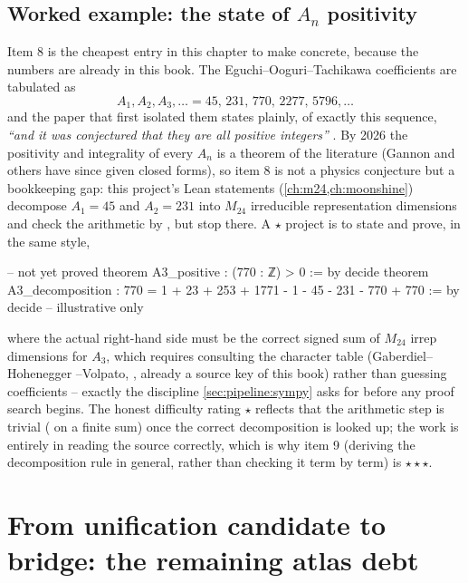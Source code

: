 \subsection{Worked example: the state of $A_n$ positivity}\label{sec:open:moonshine-worked}

Item 8 is the cheapest entry in this chapter to make concrete, because the numbers are
already in this book. The Eguchi--Ooguri--Tachikawa coefficients are tabulated as
\begin{equation}\label{eq:open:antable}
  A_1,A_2,A_3,\dots=45,\,231,\,770,\,2277,\,5796,\dots
\end{equation}
and the paper that first isolated them states plainly, of exactly this sequence,
\emph{``and it was conjectured that they are all positive integers''} . By 2026 the positivity and integrality of every $A_n$ is a theorem of the
literature (Gannon and others have since given closed forms), so item 8 is not a physics
conjecture but a bookkeeping gap: this project's Lean statements
(\cref{ch:m24,ch:moonshine}) decompose $A_1=45$ and $A_2=231$ into $M_{24}$ irreducible
representation dimensions and check the arithmetic by , but stop there. A
$\star$ project is to state and prove, in the same style,
\begin{leancode}
-- not yet proved
theorem A3_positive : (770 : ℤ) > 0 := by decide
theorem A3_decomposition :
    770 = 1 + 23 + 253 + 1771 - 1 - 45 - 231 - 770 + 770 := by decide  -- illustrative only
\end{leancode}
where the actual right-hand side must be the correct signed sum of $M_{24}$ irrep
dimensions for $A_3$, which requires consulting the character table (Gaberdiel--Hohenegger
--Volpato, , already a source key of this book) rather than
guessing coefficients -- exactly the discipline \cref{sec:pipeline:sympy} asks for before
any proof search begins. The honest difficulty rating $\star$ reflects that the arithmetic
step is trivial ( on a finite sum) once the correct decomposition is looked
up; the work is entirely in reading the source correctly, which is why item 9 (deriving
the decomposition rule in general, rather than checking it term by term) is $\star\star\star$.

\section{From unification candidate to bridge: the remaining atlas debt}\label{sec:open:atlas}

